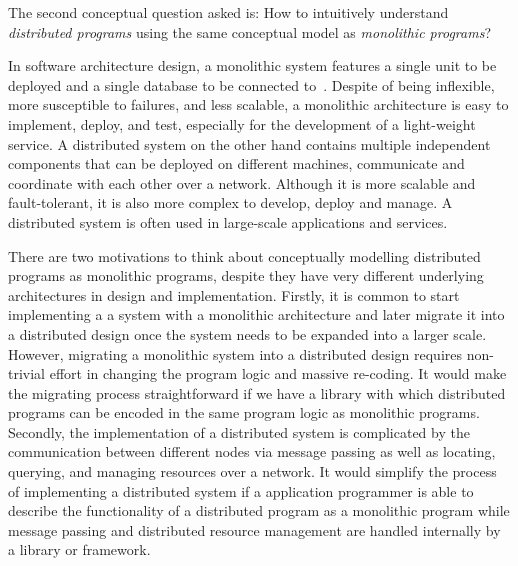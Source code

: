 \begin{center}
\vspace{-0.7em}
\vspace{-0.3em}
\end{center}

The second conceptual question asked is: How to intuitively understand \emph{distributed programs} using the same conceptual model as \emph{monolithic programs}?

In software architecture design, a monolithic system features a single unit to be deployed and a single database to be connected to~\citep{Taylor09}. Despite of being inflexible, more susceptible to failures, and less scalable, a monolithic architecture is easy to implement, deploy, and test, especially for the development of a light-weight service. A distributed system on the other hand contains multiple independent components that can be deployed on different machines, communicate and coordinate with each other over a network. Although it is more scalable and fault-tolerant, it is also more complex to develop, deploy and manage. A distributed system is often used in large-scale applications and services.

There are two motivations to think about conceptually modelling distributed programs as monolithic programs, despite they have very different underlying architectures in design and implementation. Firstly, it is common to start implementing a a system with a monolithic architecture and later migrate it into a distributed design once the system needs to be expanded into a larger scale. However, migrating a monolithic system into a distributed design requires non-trivial effort in changing the program logic and massive re-coding. It would make the migrating process straightforward if we have a library with which distributed programs can be encoded in the same program logic as monolithic programs.
Secondly, the implementation of a distributed system is complicated by the communication between different nodes via message passing as well as locating, querying, and managing resources over a network. It would simplify the process of implementing a distributed system if a application programmer is able to describe the functionality of a distributed program as a monolithic program while message passing and distributed resource management are handled internally by a library or framework.


